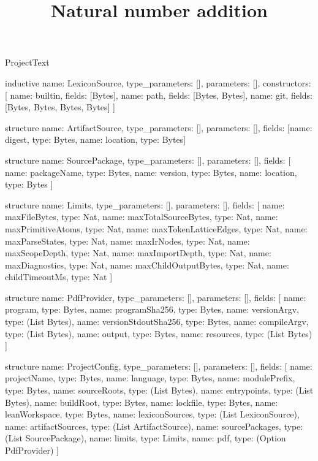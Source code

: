 \begin{lexlean}{ProjectText}
\title{Natural number addition}
\begin{semanticmodule}
inductive{
  name: LexiconSource,
  type_parameters: [],
  parameters: [],
  constructors: [
    {name: builtin, fields: [Bytes]},
    {name: path, fields: [Bytes, Bytes]},
    {name: git, fields: [Bytes, Bytes, Bytes, Bytes]}
  ]
}

structure{
  name: ArtifactSource,
  type_parameters: [],
  parameters: [],
  fields: [{name: digest, type: Bytes}, {name: location, type: Bytes}]
}

structure{
  name: SourcePackage,
  type_parameters: [],
  parameters: [],
  fields: [
    {name: packageName, type: Bytes},
    {name: version, type: Bytes},
    {name: location, type: Bytes}
  ]
}

structure{
  name: Limits,
  type_parameters: [],
  parameters: [],
  fields: [
    {name: maxFileBytes, type: Nat},
    {name: maxTotalSourceBytes, type: Nat},
    {name: maxPrimitiveAtoms, type: Nat},
    {name: maxTokenLatticeEdges, type: Nat},
    {name: maxParseStates, type: Nat},
    {name: maxIrNodes, type: Nat},
    {name: maxScopeDepth, type: Nat},
    {name: maxImportDepth, type: Nat},
    {name: maxDiagnostics, type: Nat},
    {name: maxChildOutputBytes, type: Nat},
    {name: childTimeoutMs, type: Nat}
  ]
}

structure{
  name: PdfProvider,
  type_parameters: [],
  parameters: [],
  fields: [
    {name: program, type: Bytes},
    {name: programSha256, type: Bytes},
    {name: versionArgv, type: (List Bytes)},
    {name: versionStdoutSha256, type: Bytes},
    {name: compileArgv, type: (List Bytes)},
    {name: output, type: Bytes},
    {name: resources, type: (List Bytes)}
  ]
}

structure{
  name: ProjectConfig,
  type_parameters: [],
  parameters: [],
  fields: [
    {name: projectName, type: Bytes},
    {name: language, type: Bytes},
    {name: modulePrefix, type: Bytes},
    {name: sourceRoots, type: (List Bytes)},
    {name: entrypoints, type: (List Bytes)},
    {name: buildRoot, type: Bytes},
    {name: lockfile, type: Bytes},
    {name: leanWorkspace, type: Bytes},
    {name: lexiconSources, type: (List LexiconSource)},
    {name: artifactSources, type: (List ArtifactSource)},
    {name: sourcePackages, type: (List SourcePackage)},
    {name: limits, type: Limits},
    {name: pdf, type: (Option PdfProvider)}
  ]
}


\end{semanticmodule}
\end{lexlean}
